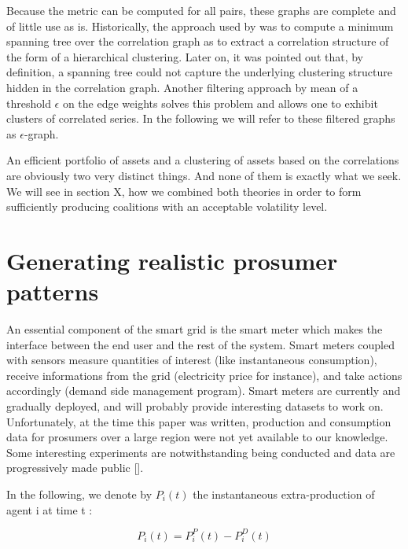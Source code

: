 \documentclass[conference]{IEEEtran}
\begin{document}
Because the metric can be computed for all pairs, these graphs are complete and of little use as is. Historically, the approach used by \cite{Mantegna1999} was to compute a minimum spanning tree over the correlation graph as to extract a correlation structure of the form of a hierarchical clustering. Later on, it was pointed out that, by definition, a spanning tree could not capture the underlying clustering structure hidden in the correlation graph. Another filtering approach by mean of a threshold $ \epsilon $ on the edge weights solves this problem and allows one to exhibit clusters of correlated series. In the following we will refer to these filtered graphs as $ \epsilon $-graph.

An efficient portfolio of assets and a clustering of assets based on the correlations are obviously two very distinct things. And none of them is exactly what we seek. We will see in section X, how we combined both theories in order to form sufficiently producing coalitions with an acceptable volatility level.

%
%

\section{Generating realistic prosumer patterns}
\label{sec:data}

An essential component of the smart grid is the smart meter which makes the interface between the end user and the rest of the system. Smart meters coupled with sensors measure quantities of interest (like instantaneous consumption), receive informations from the grid (electricity price for instance), and take actions accordingly (demand side management program). Smart meters are currently and gradually deployed, and will probably provide interesting datasets to work on. Unfortunately, at the time this paper was written, production and consumption data for prosumers over a large region were not yet available to our knowledge. Some interesting experiments are notwithstanding being conducted and data are progressively made public []. 

In the following, we denote by $ P_{i}(t) $ the instantaneous extra-production of agent i at time t :

\begin{equation}
P_{i}(t) = P_{i}^{P}(t) - P_{i}^{D}(t)
\end{equation}
\end{document}
